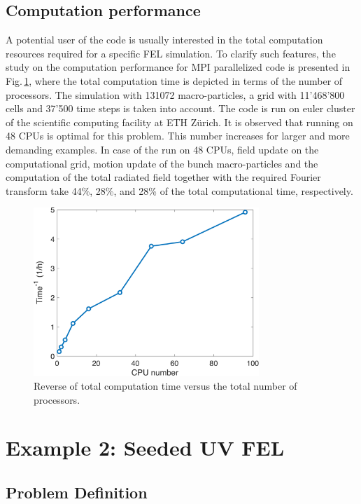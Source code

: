 \subsection{Computation performance}

A potential user of the code is usually interested in the total computation resources required for a specific FEL simulation.
%
To clarify such features, the study on the computation performance for MPI parallelized code is presented in Fig.\,\ref{computationPerformance}, where the total computation time is depicted in terms of the number of processors.
%
The simulation with 131072 macro-particles, a grid with 11'468'800 cells and 37'500 time steps is taken into account.
%
The code is run on euler cluster of the scientific computing facility at ETH Z\"urich.
%
It is observed that running on 48 CPUs is optimal for this problem.
%
This number increases for larger and more demanding examples.
%
In case of the run on 48 CPUs, field update on the computational grid, motion update of the bunch macro-particles and the computation of the total radiated field together with the required Fourier transform take 44\%, 28\%, and 28\% of the total computational time, respectively.
%
\begin{figure}
	\centering
	\includegraphics[height=2.5in]{./MITHRA_EXAMPLES/Fig5/Fig5.pdf}
	\caption{Reverse of total computation time versus the total number of processors.}
	\label{computationPerformance}
\end{figure}

\section{Example 2: Seeded UV FEL}

\subsection{Problem Definition}

